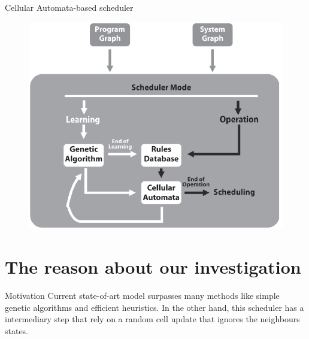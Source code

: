 \documentclass{beamer}
\begin{document}
\begin{frame}{Cellular Automata-based scheduler}
\begin{figure}
\includegraphics[width=.8\textwidth]{ca3.png}
\end{figure}
\end{frame}


\section{The reason about our investigation}
\begin{frame}{Motivation}
Current state-of-art model surpasses many methods like simple genetic algorithms and efficient heuristics. In the other hand, this scheduler has a intermediary step that rely on a random cell update that ignores the neighbours states.
\end{frame}

\end{document}
